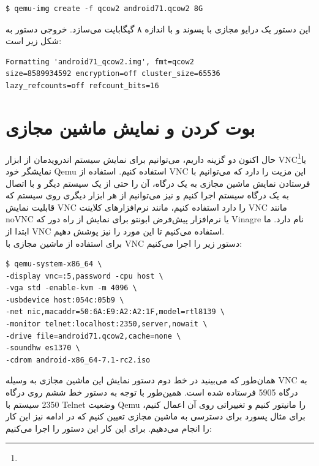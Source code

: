 \documentclass{article}
\begin{document}
\begin{latin}
\begin{verbatim}
$ qemu-img create -f qcow2 android71.qcow2 8G
\end{verbatim}
\end{latin}
این دستور یک درایو مجازی با پسوند  و با اندازه ۸ گیگابایت می‌سازد. خروجی دستور به شکل زیر است:

\begin{latin}
\begin{verbatim}
Formatting 'android71_qcow2.img', fmt=qcow2
size=8589934592 encryption=off cluster_size=65536
lazy_refcounts=off refcount_bits=16
\end{verbatim}
\end{latin}

\section*{بوت کردن و نمایش ماشین مجازی}

حال اکنون دو گزینه داریم، می‌توانیم برای نمایش سیستم اندرویدمان از ابزار VNC\footnote{}\cite{2}یا نمایشگر خود Qemu استفاده کنیم. استفاده از VNC این مزیت را دارد که می‌توانیم با فرستادن نمایش ماشین مجازی به یک درگاه، آن را حتی از یک سیستم دیگر و با اتصال به یک درگاه سیستم اجرا کنیم و نیز می‌توانیم از هر ابزار دیگری روی سیستم که قابلیت نمایش VNC را دارد استفاده کنیم، مانند نرم‌افزار‌های کلاینت VNC مانند noVNC \cite{3} یا نرم‌افزار پیش‌فرض ابونتو برای نمایش از راه دور که Vinagre \cite{4} نام دارد.
ما ابتدا از VNC استفاده می‌کنیم تا این مورد را نیز پوشش دهیم.
\\
برای استفاده از ماشین مجازی با VNC دستور زیر را اجرا می‌کنیم:

\begin{latin}
\begin{verbatim}
$ qemu-system-x86_64 \
-display vnc=:5,password -cpu host \
-vga std -enable-kvm -m 4096 \
-usbdevice host:054c:05b9 \
-net nic,macaddr=50:6A:E9:A2:A2:1F,model=rtl8139 \
-monitor telnet:localhost:2350,server,nowait \
-drive file=android71.qcow2,cache=none \
-soundhw es1370 \
-cdrom android-x86_64-7.1-rc2.iso	
\end{verbatim}
\end{latin}

همان‌طور که می‌بینید در خط دوم دستور نمایش این ماشین مجازی به وسیله VNC به درگاه 5905 فرستاده شده است. همین‌طور با توجه به دستور خط ششم روی درگاه 2350 سیستم با Telnet \cite{5} وضعیت Qemu را مانیتور کنیم و تغییراتی روی آن اعمال کنیم،‌ برای مثال پسورد برای دسترسی به ماشین مجازی تعیین کنیم که در ادامه نیز این کار را انجام می‌دهیم. برای این کار این دستور را اجرا می‌کنیم:
\end{document}

